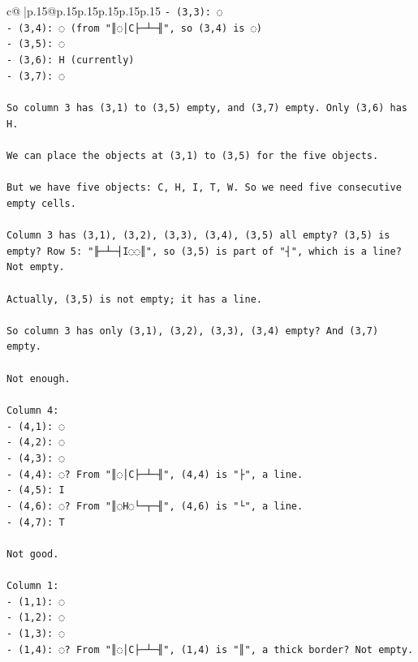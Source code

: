 \documentclass{article}
\begin{document}
{\begin{supertabular}{c@{$\;$}|p{.15\linewidth}@{}p{.15\linewidth}p{.15\linewidth}p{.15\linewidth}p{.15\linewidth}p{.15\linewidth}}
{{{\texttt{{-} (3,3): ◌} \\
\texttt{{-} (3,4): ◌ (from "║◌│C├─┴─╢", so (3,4) is ◌)} \\
\texttt{{-} (3,5): ◌} \\
\texttt{{-} (3,6): H (currently)} \\
\texttt{{-} (3,7): ◌} \\
\\ 
\texttt{So column 3 has (3,1) to (3,5) empty, and (3,7) empty. Only (3,6) has H.} \\
\\ 
\texttt{We can place the objects at (3,1) to (3,5) for the five objects.} \\
\\ 
\texttt{But we have five objects: C, H, I, T, W. So we need five consecutive empty cells.} \\
\\ 
\texttt{Column 3 has (3,1), (3,2), (3,3), (3,4), (3,5) all empty? (3,5) is empty? Row 5: "╟─┴─┤I◌◌║", so (3,5) is part of "┤", which is a line? Not empty.} \\
\\ 
\texttt{Actually, (3,5) is not empty; it has a line.} \\
\\ 
\texttt{So column 3 has only (3,1), (3,2), (3,3), (3,4) empty? And (3,7) empty.} \\
\\ 
\texttt{Not enough.} \\
\\ 
\texttt{Column 4:} \\
\texttt{{-} (4,1): ◌} \\
\texttt{{-} (4,2): ◌} \\
\texttt{{-} (4,3): ◌} \\
\texttt{{-} (4,4): ◌? From "║◌│C├─┴─╢", (4,4) is "├", a line.} \\
\texttt{{-} (4,5): I} \\
\texttt{{-} (4,6): ◌? From "║◌H◌└─┬─╢", (4,6) is "└", a line.} \\
\texttt{{-} (4,7): T} \\
\\ 
\texttt{Not good.} \\
\\ 
\texttt{Column 1:} \\
\texttt{{-} (1,1): ◌} \\
\texttt{{-} (1,2): ◌} \\
\texttt{{-} (1,3): ◌} \\
\texttt{{-} (1,4): ◌? From "║◌│C├─┴─╢", (1,4) is "║", a thick border? Not empty.} \\
}}}
\end{supertabular}}
\end{document}
